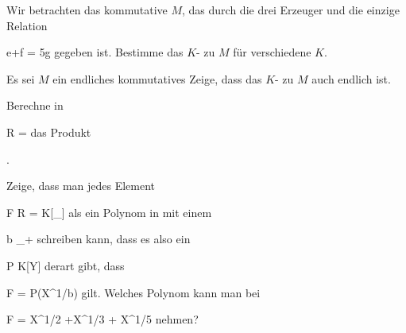 {}
{





Wir betrachten das kommutative
$M$, das durch die drei Erzeuger
 und die einzige Relation

\mavergleichskette
{\vergleichskette
{e+f
}
{ = }{ 5g
}
{  }{
}
{    }{
}
{   }{
}
}
{}{}{}
gegeben ist. Bestimme das
$K$-
zu $M$ für verschiedene
$K$.





}
{} {}

{}
{





Es sei $M$ ein endliches kommutatives
Zeige, dass das
$K$-
zu $M$ auch endlich ist.





}
{} {}

{}
{





Berechne in

\mavergleichskette
{\vergleichskette
{ R
}
{ = }{ \R[\Q_{\geq 0}]
}
{  }{
}
{    }{
}
{   }{
}
}
{}{}{}
das Produkt

 { . }






}
{} {}

{}
{





Zeige, dass man jedes Element

\mavergleichskette
{\vergleichskette
{ F
}
{ \in }{ R
}
{ = }{ K[\Q_{}]
}
{    }{
}
{   }{
}
}
{}{}{}
 {} {}
als ein Polynom in
 mit einem

\mavergleichskette
{\vergleichskette
{ b
}
{ \in }{ \N_+
}
{  }{
}
{    }{
}
{   }{
}
}
{}{}{}
schreiben kann, dass es also ein

\mavergleichskette
{\vergleichskette
{ P
}
{ \in }{ K[Y]
}
{  }{
}
{    }{
}
{   }{
}
}
{}{}{}
derart gibt, dass

\mavergleichskette
{\vergleichskette
{ F
}
{ = }{ P(X^{1/b})
}
{  }{
}
{    }{
}
{   }{
}
}
{}{}{}
gilt. Welches Polynom kann man bei

\mavergleichskettedisp
{\vergleichskette
{ F
}
{ =} { X^{1/2} +X^{1/3} + X^{1/5}
}
{ } {
}
{ } {
}
{ } {
}
}
{}{}{}
nehmen?





}
{} {}


